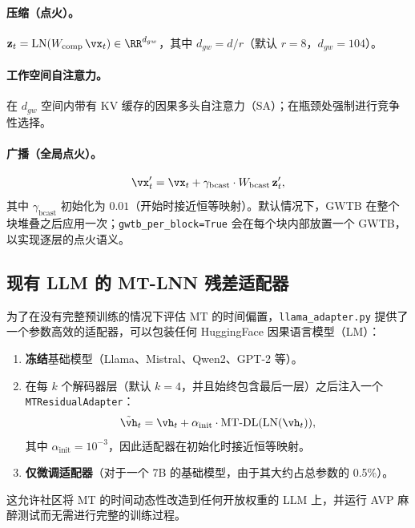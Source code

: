 \paragraph{压缩（点火）。}
$\mathbf{z}_t = \mathrm{LN}(W_\text{comp}\,\vx_t)\in\RR^{d_{gw}}$，其中 $d_{gw}=d/r$（默认 $r=8$，$d_{gw}=104$）。

\paragraph{工作空间自注意力。}
在 $d_{gw}$ 空间内带有 KV 缓存的因果多头自注意力（SA）；在瓶颈处强制进行竞争性选择。

\paragraph{广播（全局点火）。}
\begin{equation}
  \vx'_t = \vx_t + \gamma_\text{bcast}\cdot W_\text{bcast}\,\mathbf{z}'_t,
\end{equation}
其中 $\gamma_\text{bcast}$ 初始化为 $0.01$（开始时接近恒等映射）。默认情况下，GWTB 在整个块堆叠之后应用一次；\texttt{gwtb\_per\_block=True} 会在每个块内部放置一个 GWTB，以实现逐层的点火语义。

\subsection{现有 LLM 的 MT-LNN 残差适配器}
\label{sec:adapter}

为了在没有完整预训练的情况下评估 MT 的时间偏置，\texttt{llama\_adapter.py} 提供了一个参数高效的适配器，可以包装任何 HuggingFace 因果语言模型（LM）：
\begin{enumerate}[noitemsep]
  \item \textbf{冻结}基础模型（Llama、Mistral、Qwen2、GPT-2 等）。
  \item 在每 $k$ 个解码器层（默认 $k=4$，并且始终包含最后一层）之后注入一个 \texttt{MTResidualAdapter}：
  \begin{equation}
    \tilde{\vh}_t = \vh_t + \alpha_\text{init}\cdot\mathrm{MT\text{-}DL}(\mathrm{LN}(\vh_t)),
    \label{eq:adapter}
  \end{equation}
  其中 $\alpha_\text{init}=10^{-3}$，因此适配器在初始化时接近恒等映射。
  \item \textbf{仅微调适配器}（对于一个 7B 的基础模型，由于其大约占总参数的 0.5\%）。
\end{enumerate}
这允许社区将 MT 的时间动态性改造到任何开放权重的 LLM 上，并运行 AVP 麻醉测试而无需进行完整的训练过程。

